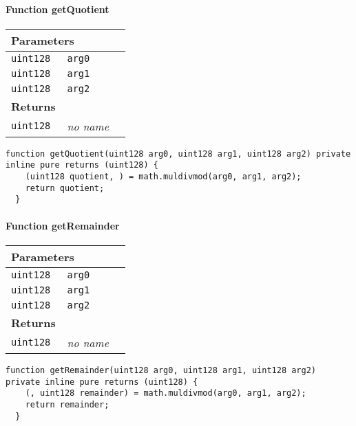 \paragraph{Function getQuotient}


\ifsoltables
\noindent\begin{tabular}{|l|l|p{5cm}|}\hline
\multicolumn{3}{|l|}{\bf Parameters}\\\hline
\tt uint128 & \tt arg0 &\\\hline
\tt uint128 & \tt arg1 &\\\hline
\tt uint128 & \tt arg2 &\\\hline
\multicolumn{3}{|l|}{\bf Returns}\\\hline
\tt uint128 & {\em no name} &\\\hline
\end{tabular}
\fi

\vspace{2cm}

\begin{lstlisting}[firstnumber=109]
  function getQuotient(uint128 arg0, uint128 arg1, uint128 arg2) private inline pure returns (uint128) {
    (uint128 quotient, ) = math.muldivmod(arg0, arg1, arg2);
    return quotient;
  }
\end{lstlisting}

\paragraph{Function getRemainder}


\ifsoltables
\noindent\begin{tabular}{|l|l|p{5cm}|}\hline
\multicolumn{3}{|l|}{\bf Parameters}\\\hline
\tt uint128 & \tt arg0 &\\\hline
\tt uint128 & \tt arg1 &\\\hline
\tt uint128 & \tt arg2 &\\\hline
\multicolumn{3}{|l|}{\bf Returns}\\\hline
\tt uint128 & {\em no name} &\\\hline
\end{tabular}
\fi

\vspace{2cm}

\begin{lstlisting}[firstnumber=115]
  function getRemainder(uint128 arg0, uint128 arg1, uint128 arg2) private inline pure returns (uint128) {
    (, uint128 remainder) = math.muldivmod(arg0, arg1, arg2);
    return remainder;
  }
\end{lstlisting}

